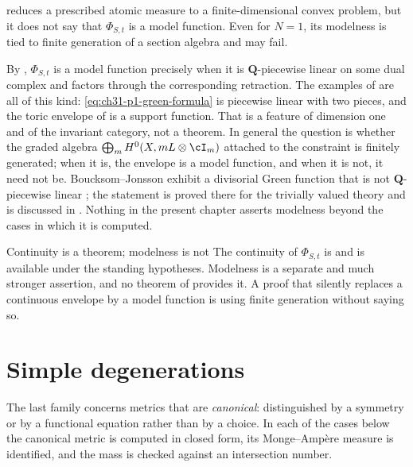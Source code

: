  reduces a prescribed atomic measure to a
finite-dimensional convex problem, but it does not say that \(\Phi_{S,t}\)
is a model function.  Even for \(N=1\), its modelness is tied to finite
generation of a section algebra and may fail.

\begin{remark}
\label{rem:ch31-modelness}
By , \(\Phi_{S,t}\) is a model
function precisely when it is \(\mathbf Q\)-piecewise linear on some dual
complex and factors through the corresponding retraction.  The examples of
 are all of this kind: \eqref{eq:ch31-p1-green-formula}
is piecewise linear with two pieces, and the toric envelope of
 is a support function.  That is a feature of
dimension one and of the invariant category, not a theorem.  In general the
question is whether the graded algebra
\(\bigoplus_m H^0(X,mL\otimes\cI_m)\) attached to the constraint is finitely
generated; when it is, the envelope is a model function, and when it is not,
it need not be.  Boucksom--Jonsson exhibit a divisorial Green function that
is not \(\mathbf Q\)-piecewise linear \cite[Theorem~A]{BJGreen24}; the
statement is proved there for the trivially valued theory and is discussed
in .  Nothing in the present chapter asserts modelness beyond
the cases in which it is computed.
\end{remark}

\begin{warning}{Continuity is a theorem; modelness is not}
The continuity of \(\Phi_{S,t}\) is
 and is available under the standing
hypotheses.  Modelness is a separate and much stronger assertion, and no
theorem of  provides it.  A proof that silently replaces a
continuous envelope by a model function is using finite generation without
saying so.
\end{warning}

\section{Simple degenerations}
\label{sec:ch31-degenerations}

The last family concerns metrics that are \emph{canonical}: distinguished by
a symmetry or by a functional equation rather than by a choice.  In each of
the cases below the canonical metric is computed in closed form, its
Monge--Amp\`ere measure is identified, and the mass is checked against an
intersection number.

